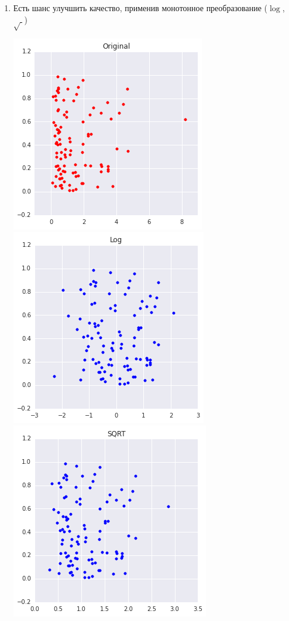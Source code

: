 \documentclass[aspectratio=169]{beamer}
\begin{document}
\begin{frame}
\begin{enumerate}
\begin{center}
\end{center}
\item Есть шанс улучшить качество, применив монотонное преобразование ($\log$, $\sqrt{\;}$)
\begin{center}
$  $\includegraphics[scale=0.2]{images/orig.png}
\includegraphics[scale=0.2]{images/log.png}
\includegraphics[scale=0.2]{images/sqrt.png}
\end{center}
\end{enumerate}

\end{frame}
\end{document}
